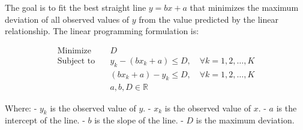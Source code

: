 \documentclass{article}
\begin{document}
The goal is to fit the best straight line \( y = bx + a \) that minimizes the maximum deviation of all observed values of \( y \) from the value predicted by the linear relationship. The linear programming formulation is:

\[
\begin{align*}
\text{Minimize} \quad & D \\
\text{Subject to} \quad & y_k - (bx_k + a) \leq D, \quad \forall k = 1, 2, \ldots, K \\
& (bx_k + a) - y_k \leq D, \quad \forall k = 1, 2, \ldots, K \\
& a, b, D \in \mathbb{R}
\end{align*}
\]

Where:
- \( y_k \) is the observed value of \( y \).
- \( x_k \) is the observed value of \( x \).
- \( a \) is the intercept of the line.
- \( b \) is the slope of the line.
- \( D \) is the maximum deviation.
\end{document}
